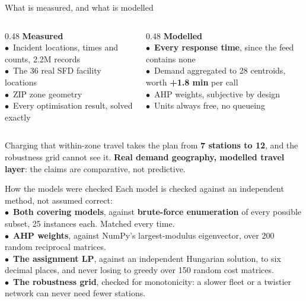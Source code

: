 \documentclass[aspectratio=169,10pt]{beamer}
\newcommand{\hairline}[1][0.6em]{%
  \par\vspace{0.3em}\noindent{\color{rule}\rule{\textwidth}{0.6pt}}\par\vspace{#1}%
}
\begin{document}
\begin{frame}{What is measured, and what is modelled}
  \vspace{0.5em}
  \begin{columns}[T,onlytextwidth]
    \begin{column}{0.48\textwidth}
      {\color{good}\textbf{Measured}}\\[0.5em]
      {\footnotesize\color{inks}
      $\bullet$\ Incident locations, times and counts, 2.2M records\\[0.35em]
      $\bullet$\ The 36 real SFD facility locations\\[0.35em]
      $\bullet$\ ZIP zone geometry\\[0.35em]
      $\bullet$\ Every optimisation result, solved exactly}
    \end{column}
    \begin{column}{0.48\textwidth}
      {\color{s2}\textbf{Modelled}}\\[0.5em]
      {\footnotesize\color{inks}
      $\bullet$\ \textbf{Every response time}, since the feed contains none\\[0.35em]
      $\bullet$\ Demand aggregated to 28 centroids, worth
      \textbf{+1.8 min} per call\\[0.35em]
      $\bullet$\ AHP weights, subjective by design\\[0.35em]
      $\bullet$\ Units always free, no queueing}
    \end{column}
  \end{columns}
  \vspace{1.0em}
  \hairline[0.6em]
  {\footnotesize\color{inks}Charging that within-zone travel takes the plan
  from \textbf{7 stations to 12}, and the robustness grid cannot see it.
  \textbf{Real demand geography, modelled travel layer}: the claims are
  comparative, not predictive.}
\end{frame}

\begin{frame}{How the models were checked}
  \vspace{0.5em}
  {\color{inks}Each model is checked against an independent method, not
  assumed correct:}\\[0.9em]
  {\footnotesize\color{inks}
  $\bullet$\ \textbf{Both covering models}, against \textbf{brute-force
  enumeration} of every possible subset, 25 instances each. Matched every
  time.\\[0.6em]
  $\bullet$\ \textbf{AHP weights}, against NumPy's largest-modulus
  eigenvector, over 200 random reciprocal matrices.\\[0.6em]
  $\bullet$\ \textbf{The assignment LP}, against an independent Hungarian
  solution, to six decimal places, and never losing to greedy over 150
  random cost matrices.\\[0.6em]
  $\bullet$\ \textbf{The robustness grid}, checked for monotonicity: a slower
  fleet or a twistier network can never need fewer stations.}
\end{frame}
\end{document}
